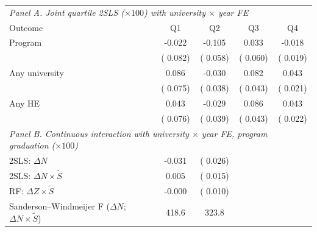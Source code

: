 \begin{tabular}{lcccc}
\toprule
\multicolumn{5}{l}{\textit{Panel A. Joint quartile 2SLS (\(\times 100\)) with university \(\times\) year FE}} \\
Outcome & Q1 & Q2 & Q3 & Q4 \\
\midrule
Program &  -0.022 &  -0.105\sym{*} &   0.033 &  -0.018 \\
 & ( 0.082) & ( 0.058) & ( 0.060) & ( 0.019) \\
Any university &   0.086 &  -0.030 &   0.082\sym{*} &   0.043\sym{**} \\
 & ( 0.075) & ( 0.038) & ( 0.043) & ( 0.021) \\
Any HE &   0.043 &  -0.029 &   0.086\sym{**} &   0.043\sym{**} \\
 & ( 0.076) & ( 0.039) & ( 0.043) & ( 0.022) \\
\midrule
\multicolumn{5}{l}{\textit{Panel B. Continuous interaction with university \(\times\) year FE, program graduation (\(\times 100\))}} \\
2SLS: \(\Delta N\) &  -0.031 & ( 0.026) & & \\
2SLS: \(\Delta N \times \tilde S\) &   0.005 & ( 0.015) & & \\
RF: \(\Delta Z \times \tilde S\) &  -0.000 & ( 0.010) & & \\
Sanderson--Windmeijer F (\(\Delta N\); \(\Delta N\times\tilde S\)) &  418.6 &  323.8 & & \\
\bottomrule
\end{tabular}
